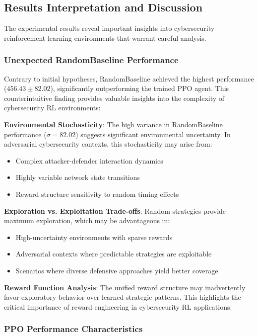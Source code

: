 \documentclass[12pt,twoside]{article}
\theoremstyle{definition}
\theoremstyle{plain}
\begin{document}
\subsection{Results Interpretation and Discussion}

The experimental results reveal important insights into cybersecurity reinforcement learning environments that warrant careful analysis.

\subsubsection{Unexpected RandomBaseline Performance}

Contrary to initial hypotheses, RandomBaseline achieved the highest performance ($456.43 \pm 82.02$), significantly outperforming the trained PPO agent. This counterintuitive finding provides valuable insights into the complexity of cybersecurity RL environments:

\textbf{Environmental Stochasticity}: The high variance in RandomBaseline performance ($\sigma = 82.02$) suggests significant environmental uncertainty. In adversarial cybersecurity contexts, this stochasticity may arise from:
\begin{itemize}
    \item Complex attacker-defender interaction dynamics
    \item Highly variable network state transitions
    \item Reward structure sensitivity to random timing effects
\end{itemize}

\textbf{Exploration vs. Exploitation Trade-offs}: Random strategies provide maximum exploration, which may be advantageous in:
\begin{itemize}
    \item High-uncertainty environments with sparse rewards
    \item Adversarial contexts where predictable strategies are exploitable
    \item Scenarios where diverse defensive approaches yield better coverage
\end{itemize}

\textbf{Reward Function Analysis}: The unified reward structure may inadvertently favor exploratory behavior over learned strategic patterns. This highlights the critical importance of reward engineering in cybersecurity RL applications.

\subsubsection{PPO Performance Characteristics}
\end{document}
